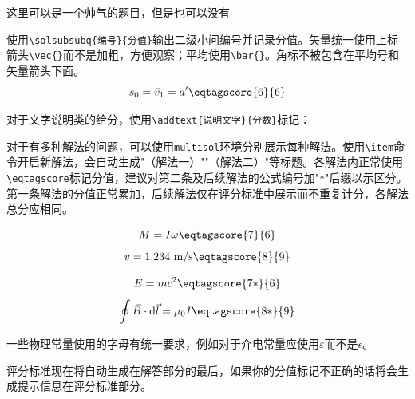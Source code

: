 \documentclass[answer]{cphos}
\begin{document}
\begin{problem}[40]{这里可以是一个帅气的题目，但是也可以没有}
\begin{solution}
使用\texttt{\textbackslash solsubsubq\{编号\}\{分值\}}输出二级小问编号并记录分值。矢量统一使用上标箭头\texttt{\textbackslash vec\{\}}而不是加粗，方便观察；平均使用\texttt{\textbackslash bar\{\}}。角标不被包含在平均号和矢量箭头下面。
\begin{equation}
    \bar{s}_0 = \vec{v}_1 = a' \eqtagscore{6}{6} \label{eq:2.1.1}
\end{equation}

对于文字说明类的给分，使用\texttt{\textbackslash addtext\{说明文字\}\{分数\}}标记：

对于有多种解法的问题，可以使用\texttt{multisol}环境分别展示每种解法。使用\texttt{\textbackslash item}命令开启新解法，会自动生成"（解法一）""（解法二）"等标题。各解法内正常使用\texttt{\textbackslash eqtagscore}标记分值，建议对第二条及后续解法的公式编号加"\texttt{*}"后缀以示区分。第一条解法的分值正常累加，后续解法仅在评分标准中展示而不重复计分，各解法总分应相同。

\begin{multisol}
\item
\begin{equation}
    M = I\omega \eqtagscore{7}{6}
\end{equation}
\begin{equation}
    v = 1.234 \text{~m/s} \eqtagscore{8}{9}
\end{equation}
\item
\begin{equation}
    E = mc^2 \eqtagscore{7*}{6}
\end{equation}
\begin{equation}
    \oint \vec{B} \cdot \mathrm{d}\vec{l} = \mu_0 I \eqtagscore{8*}{9}
\end{equation}
\end{multisol}

一些物理常量使用的字母有统一要求，例如对于介电常量应使用$\varepsilon$而不是$\epsilon$。

评分标准现在将自动生成在解答部分的最后，如果你的分值标记不正确的话将会生成提示信息在评分标准部分。

\begin{problemreferences}
\end{problemreferences}


\end{solution}
\end{problem}
\end{document}
